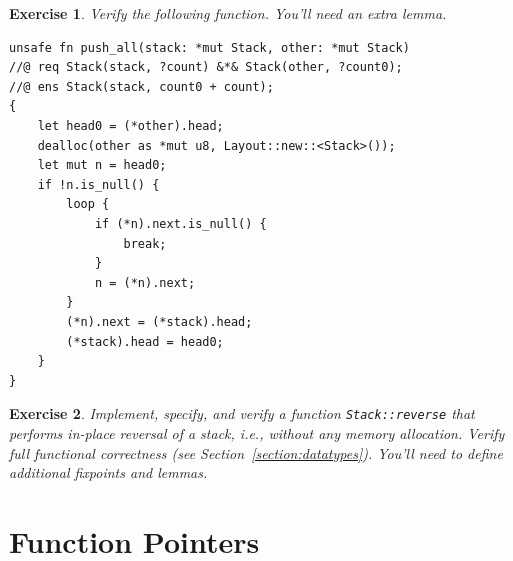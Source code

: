 \documentclass{article}
\newtheorem{exercise}{Exercise}
\begin{document}
\begin{exercise}\label{exercise:push_all}
Verify the following function. You'll need an extra lemma.
\end{exercise}
\begin{lstlisting}
unsafe fn push_all(stack: *mut Stack, other: *mut Stack)
//@ req Stack(stack, ?count) &*& Stack(other, ?count0);
//@ ens Stack(stack, count0 + count);
{
    let head0 = (*other).head;
    dealloc(other as *mut u8, Layout::new::<Stack>());
    let mut n = head0;
    if !n.is_null() {
        loop {
            if (*n).next.is_null() {
                break;
            }
            n = (*n).next;
        }
        (*n).next = (*stack).head;
        (*stack).head = head0;
    }
}
\end{lstlisting}

\begin{exercise}\label{exercise:reverse}
Implement, specify, and verify a function
\lstinline!Stack::reverse! that performs in-place reversal of a
stack, i.e., without any memory allocation. Verify full
functional correctness (see Section~\ref{section:datatypes}).
You'll need to define additional fixpoints and lemmas.
\end{exercise}

\section{Function Pointers}\label{section:function-pointers}
\end{document}
